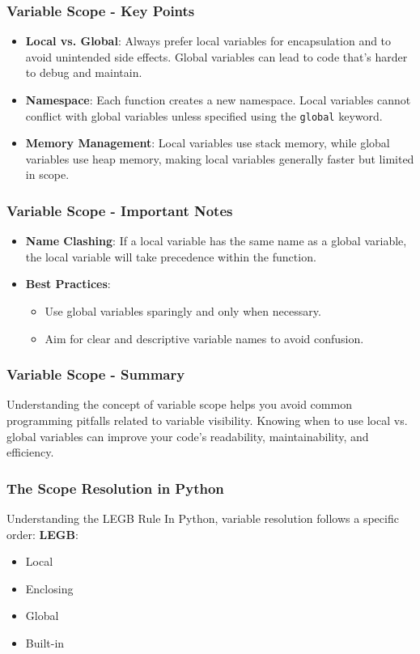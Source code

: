 \documentclass{beamer}
\begin{document}
\begin{frame}[fragile]
    \frametitle{Variable Scope - Key Points}
    \begin{itemize}
        \item \textbf{Local vs. Global}: Always prefer local variables for encapsulation and to avoid unintended side effects. Global variables can lead to code that's harder to debug and maintain.
        
        \item \textbf{Namespace}: Each function creates a new namespace. Local variables cannot conflict with global variables unless specified using the \texttt{global} keyword.
        
        \item \textbf{Memory Management}: Local variables use stack memory, while global variables use heap memory, making local variables generally faster but limited in scope.
    \end{itemize}
\end{frame}

\begin{frame}[fragile]
    \frametitle{Variable Scope - Important Notes}
    \begin{itemize}
        \item \textbf{Name Clashing}: If a local variable has the same name as a global variable, the local variable will take precedence within the function.
        
        \item \textbf{Best Practices}: 
        \begin{itemize}
            \item Use global variables sparingly and only when necessary.
            \item Aim for clear and descriptive variable names to avoid confusion.
        \end{itemize}
    \end{itemize}
\end{frame}

\begin{frame}[fragile]
    \frametitle{Variable Scope - Summary}
    Understanding the concept of variable scope helps you avoid common programming pitfalls related to variable visibility. Knowing when to use local vs. global variables can improve your code's readability, maintainability, and efficiency.
\end{frame}

\begin{frame}
    \frametitle{The Scope Resolution in Python}
    \begin{block}{Understanding the LEGB Rule}
        In Python, variable resolution follows a specific order: 
        \textbf{LEGB}:
        \begin{itemize}
            \item Local
            \item Enclosing
            \item Global
            \item Built-in
        \end{itemize}
    \end{block}
\end{frame}
\end{document}
